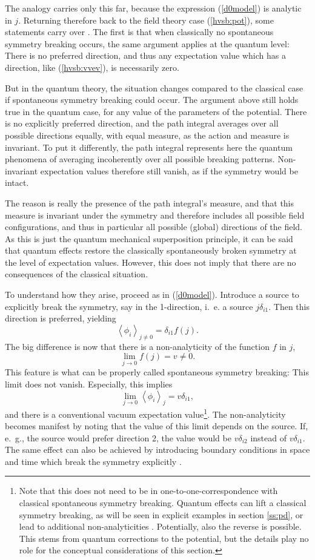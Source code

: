 \documentclass[final,twoside,12pt]{article}
\newcommand*{\no}{\noindent}
\newcommand*{\be}{\begin{equation}}
\newcommand*{\ee}{\end{equation}}
\newcommand*{\pref}[1]{(\ref{#1})}
\newcommand*{\1}{1\!\!\!\bot}
\newcommand*{\la}{\left\langle}
\newcommand*{\ra}{\right\rangle}
\begin{document}
The analogy carries only this far, because the expression \pref{d0model} is analytic in $j$. Returning therefore back to the field theory case \pref{hvsb:pot}, some statements carry over \cite{Perez:2008fv}. The first is that when classically no spontaneous symmetry breaking occurs, the same argument applies at the quantum level: There is no preferred direction, and thus any expectation value which has a direction, like \pref{hvsb:vvev}, is necessarily zero.

But in the quantum theory, the situation changes compared to the classical case if spontaneous symmetry breaking could occur. The argument above still holds true in the quantum case, for any value of the parameters of the potential. There is no explicitly preferred direction, and the path integral averages over all possible directions equally, with equal measure, as the action and measure is invariant. To put it differently, the path integral represents here the quantum phenomena of averaging incoherently over all possible breaking patterns. Non-invariant expectation values therefore still vanish, as if the symmetry would be intact.

The reason is really the presence of the path integral's measure, and that this measure is invariant under the symmetry and therefore includes all possible field configurations, and thus in particular all possible (global) directions of the field. As this is just the quantum mechanical superposition principle, it can be said that quantum effects restore the classically spontaneously broken symmetry at the level of expectation values. However, this does not imply that there are no consequences of the classical situation.

To understand how they arise, proceed as in \pref{d0model}. Introduce a source to explicitly break the symmetry, say in the 1-direction, i.\ e. a source $j\delta_{i1}$. Then this direction is preferred, yielding
\be
\la\phi_i\ra_{j\neq 0}=\delta_{i1}f(j)\label{vev}.
\ee
\no The big difference is now that there is a non-analyticity of the function $f$ in $j$,
\be
\lim_{j\to 0}f(j)=v\neq 0\label{vevlimit}.
\ee
\no This feature is what can be properly called spontaneous symmetry breaking: This limit does not vanish. Especially, this implies
\be
\lim_{j\to 0}\la\phi_i\ra_{j}=v\delta_{i1}\label{limssb},
\ee
\no and there is a conventional vacuum expectation value\footnote{Note that this does not need to be in one-to-one-correspondence with classical spontaneous symmetry breaking. Quantum effects can lift a classical symmetry breaking, as will be seen in explicit examples in section \ref{ss:pd}, or lead to additional non-analyticities \cite{Maas:2013sca}. Potentially, also the reverse is possible. This stems from quantum corrections to the potential, but the details play no role for the conceptual considerations of this section.}. The non-analyticity becomes manifest by noting that the value of this limit depends on the source. If, e.\ g., the source would prefer direction 2, the value would be $v\delta_{i2}$ instead of $v\delta_{i1}$. The same effect can also be achieved by introducing boundary conditions in space and time which break the symmetry explicitly \cite{Strocchi:2005yk,Frohlich:1976it}.
\end{document}
